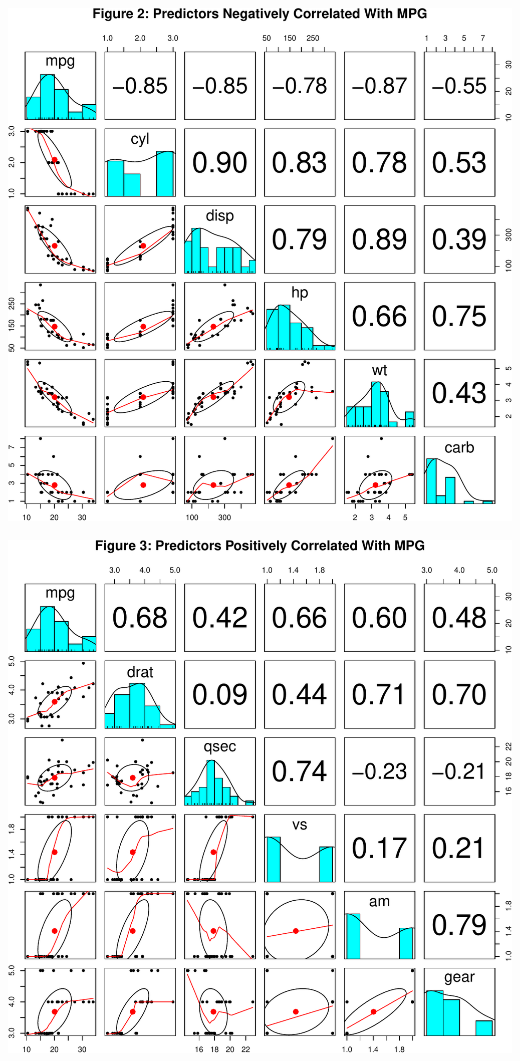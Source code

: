 \documentclass[]{article}
\begin{document}
\includegraphics{mtcars_files/figure-latex/scatterplot1-1.pdf}

\includegraphics{mtcars_files/figure-latex/scatterplot2-1.pdf}
\end{document}
